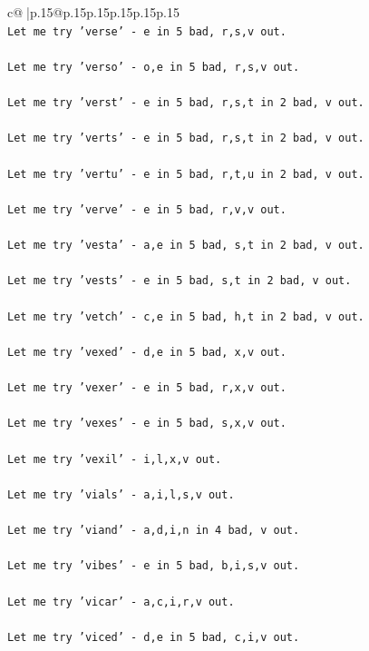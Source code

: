 \documentclass{article}
\begin{document}
{\begin{supertabular}{c@{$\;$}|p{.15\linewidth}@{}p{.15\linewidth}p{.15\linewidth}p{.15\linewidth}p{.15\linewidth}p{.15\linewidth}}
{{{\\ 
\texttt{Let me try 'verse' {-} e in 5 bad, r,s,v out. } \\
\\ 
\texttt{Let me try 'verso' {-} o,e in 5 bad, r,s,v out. } \\
\\ 
\texttt{Let me try 'verst' {-} e in 5 bad, r,s,t in 2 bad, v out. } \\
\\ 
\texttt{Let me try 'verts' {-} e in 5 bad, r,s,t in 2 bad, v out. } \\
\\ 
\texttt{Let me try 'vertu' {-} e in 5 bad, r,t,u in 2 bad, v out. } \\
\\ 
\texttt{Let me try 'verve' {-} e in 5 bad, r,v,v out. } \\
\\ 
\texttt{Let me try 'vesta' {-} a,e in 5 bad, s,t in 2 bad, v out. } \\
\\ 
\texttt{Let me try 'vests' {-} e in 5 bad, s,t in 2 bad, v out. } \\
\\ 
\texttt{Let me try 'vetch' {-} c,e in 5 bad, h,t in 2 bad, v out. } \\
\\ 
\texttt{Let me try 'vexed' {-} d,e in 5 bad, x,v out. } \\
\\ 
\texttt{Let me try 'vexer' {-} e in 5 bad, r,x,v out. } \\
\\ 
\texttt{Let me try 'vexes' {-} e in 5 bad, s,x,v out. } \\
\\ 
\texttt{Let me try 'vexil' {-} i,l,x,v out. } \\
\\ 
\texttt{Let me try 'vials' {-} a,i,l,s,v out. } \\
\\ 
\texttt{Let me try 'viand' {-} a,d,i,n in 4 bad, v out. } \\
\\ 
\texttt{Let me try 'vibes' {-} e in 5 bad, b,i,s,v out. } \\
\\ 
\texttt{Let me try 'vicar' {-} a,c,i,r,v out. } \\
\\ 
\texttt{Let me try 'viced' {-} d,e in 5 bad, c,i,v out. } \\
}}}
\end{supertabular}}
\end{document}
